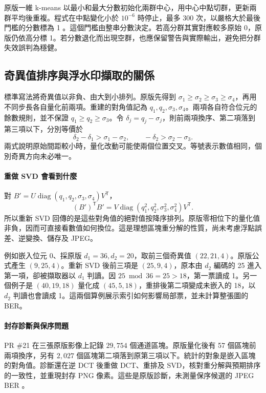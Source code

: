 \documentclass[12pt,a4paper,onecolumn]{article}
\begin{document}
原版一維 k-means 以最小和最大分數初始化兩群中心，用中心中點切群，更新兩群平均後重複。程式在中點變化小於 \(10^{-6}\) 時停止，最多 300 次，以嚴格大於最後門檻的分數標為 1 \cite{core,interface}。這個門檻由整串分數決定。若高分群其實對應較多原始 0，原版仍依高分標 1。若分數退化而出現空群，也應保留警告與實際輸出，避免把分群失效誤判為穩健。

\subsection{奇異值排序與浮水印擷取的關係}
\label{sec:ordering}
標準寫法將奇異值以非負、由大到小排列。原版先得到 \(\sigma_1\ge \sigma_2\ge \sigma_3\ge \sigma_4\)，再用不同步長各自量化前兩項。重建的對角值記為 \(q_1,q_2,\sigma_3,\sigma_4\)。兩項各自符合位元的餘數規則，並不保證 \(q_1\ge q_2\ge \sigma_3\)。令 \(\delta_j=q_j-\sigma_j\)，則前兩項換序、第二項落到第三項以下，分別等價於
\[
 \delta_2-\delta_1>\sigma_1-\sigma_2,\qquad
 -\delta_2>\sigma_2-\sigma_3.
\]
兩式說明原始間距較小時，量化改動可能使兩個位置交叉。等號表示數值相同，個別奇異方向未必唯一。

\paragraph{重做 SVD 會看到什麼}
對 \(B'=U\operatorname{diag}(q_1,q_2,\sigma_3,\sigma_4)V^{\mathsf T}\)，
\[
 (B')^{\mathsf T}B'
  =V\operatorname{diag}(q_1^2,q_2^2,\sigma_3^2,\sigma_4^2)V^{\mathsf T}.
\]
所以重新 SVD 回傳的是這些對角值的絕對值按降序排列。原版零相位下的量化值非負，因而可直接看數值如何換位。這是理想區塊重分解的性質，尚未考慮浮點誤差、逆變換、儲存及 JPEG。

例如嵌入位元 0、採原版 \(d_1=36,d_2=20\)，取前三個奇異值 \((22,21,4)\)。原版公式產生 \((9,25,4)\)。重新 SVD 後前三項是 \((25,9,4)\)，原本由 \(d_2\) 編碼的 25 進入第一項，卻被擷取器以 \(d_1\) 判讀。因 \(25\bmod36=25>18\)，第一票讀成 1。另一個例子是 \((40,19,18)\) 量化成 \((45,5,18)\)，重排後第二項變成未嵌入的 18，以 \(d_2\) 判讀也會讀成 1。這兩個算例展示索引如何影響局部票，並未計算整張圖的 BER。

\paragraph{封存診斷與保序問題}
PR \#21 在三張原版影像上記錄 \(29{,}754\) 個通道區塊。原版量化後有 57 個區塊前兩項換序，另有 \(2{,}027\) 個區塊第二項落到原第三項以下。統計的對象是嵌入區塊的對角值。診斷還在逆 DCT 後重做 DCT、重排及 SVD，核對重分解與預期排序的一致性，並重現封存 PNG 像素。這些是原版診斷，未測量保序候選的 JPEG BER \cite{ordering}。
\end{document}
